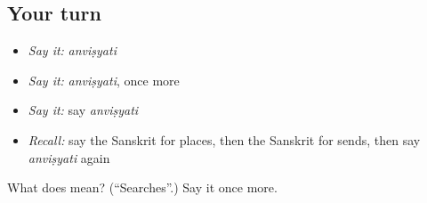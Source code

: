 \subsection*{Your turn}
\begin{itemize}
\raggedright
  \item \emph{Say it:} \emph{anviṣyati}
  \item \emph{Say it:} \emph{anviṣyati}, once more
  \item \emph{Say it:} say \emph{anviṣyati}
  \item \emph{Recall:} say the Sanskrit for places, then the Sanskrit for sends, then say \emph{anviṣyati} again
\end{itemize}

\begin{tcolorbox}[breakable,colback=teal!4,colframe=teal!35!black,title={Before you move on}]
What does  mean? (\textquotedblleft{}Searches\textquotedblright{}.) Say it once more.
\end{tcolorbox}
